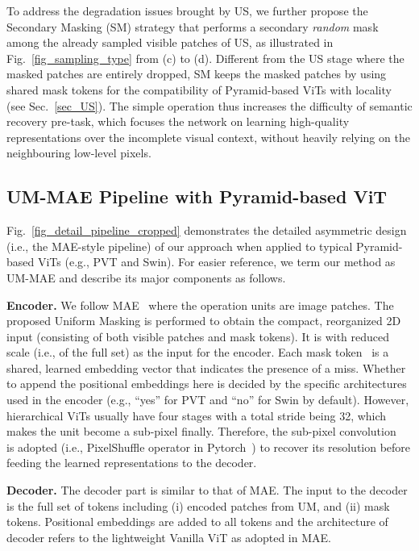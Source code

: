 \documentclass{article}
\begin{document}
To address the degradation issues brought by US, we further propose the Secondary Masking (SM) strategy that performs a secondary \emph{random} mask among the already sampled visible patches of US, as illustrated in Fig.~\ref{fig_sampling_type} from (c) to (d). Different from the US stage where the masked patches are entirely dropped, SM keeps the masked patches by using shared mask tokens for the compatibility of Pyramid-based ViTs with locality (see Sec.~\ref{sec_US}).
The simple operation thus increases the difficulty of semantic recovery pre-task, which focuses the network on learning high-quality representations over the incomplete visual context, without heavily relying on the neighbouring low-level pixels.








\subsection{UM-MAE Pipeline with Pyramid-based ViT}
Fig.~\ref{fig_detail_pipeline_cropped} demonstrates the detailed asymmetric design (i.e., the MAE-style pipeline) of our approach when applied to typical Pyramid-based ViTs (e.g., PVT and Swin). For easier reference, we term our method as UM-MAE and describe its major components as follows.

\textbf{Encoder.} We follow MAE~\cite{he2021masked} where the operation units are  image patches. The proposed Uniform Masking is performed to obtain the compact, reorganized 2D input (consisting of both visible patches and mask tokens). It is with reduced scale (i.e.,  of the full set) as the input for the encoder. Each mask token~\cite{devlin2018bert} is a shared, learned embedding vector that indicates the presence of a miss. Whether to append the positional embeddings here is decided by the specific architectures used in the encoder (e.g., ``yes'' for PVT and ``no'' for Swin by default). 
However, hierarchical ViTs usually have four stages with a total stride being 32, which makes the  unit become a sub-pixel finally. Therefore, the sub-pixel convolution~\cite{shi2016real} is adopted (i.e., PixelShuffle operator in Pytorch~\cite{paszke2019pytorch}) to recover its resolution before feeding the learned representations to the decoder.

\textbf{Decoder.} The decoder part is similar to that of MAE. The input to the decoder is the full set of tokens including (i) encoded patches from UM, and (ii) mask tokens. Positional embeddings are added to all tokens and the architecture of decoder refers to the lightweight Vanilla ViT as adopted in MAE.
\end{document}
